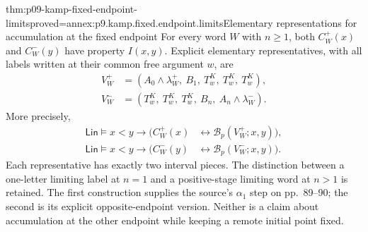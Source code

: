 \begin{hblemma}{thm:p09-kamp-fixed-endpoint-limits}{proved=annex:p9.kamp.fixed.endpoint.limits}{Elementary representations for accumulation at the fixed endpoint}
For every word \(W\) with \(n\geq1\), both \(C_W^+(x)\)
and \(C_W^-(y)\) have property \(I(x,y)\).
Explicit elementary representatives, with all labels written at their
common free argument \(w\), are
\[
\begin{aligned}
 V_W^+&=(A_0\land\lambda_W^+,\ B_1,\ T^K_w,\ T^K_w,\ T^K_w),\\
 V_W^-&=(T^K_w,\ T^K_w,\ T^K_w,\ B_n,\ A_n\land\lambda_W^-).
\end{aligned}
\]
More precisely,
\[
\begin{aligned}
 \mathsf{Lin}\models x<y\to
    (C_W^+(x)&\longleftrightarrow\mathcal B_p(V_W^+;x,y)),\\
 \mathsf{Lin}\models x<y\to
    (C_W^-(y)&\longleftrightarrow\mathcal B_p(V_W^-;x,y)).
\end{aligned}
\]
Each representative has exactly two interval pieces. The distinction
between a one-letter limiting label at \(n=1\) and a positive-stage
limiting word at \(n>1\) is retained. The first construction
supplies the source's \(\alpha_1\) step on pp.~89--90;
the second is its explicit opposite-endpoint version. Neither is a
claim about accumulation at the other endpoint while keeping a remote
initial point fixed.
\end{hblemma}

